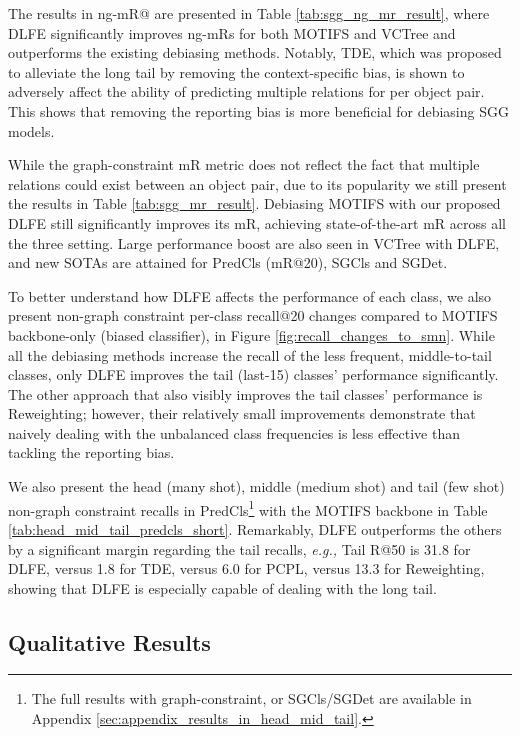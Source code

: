 \documentclass[sigconf]{acmart}
\begin{document}
The results in ng-mR@ are presented in Table \ref{tab:sgg_ng_mr_result}, where DLFE significantly improves ng-mRs for both MOTIFS and VCTree and outperforms the existing debiasing methods.
Notably, TDE, which was proposed to alleviate the long tail by removing the context-specific bias, is shown to adversely affect the ability of predicting multiple relations for per object pair.
This shows that removing the reporting bias is more beneficial for debiasing SGG models.


While the graph-constraint mR metric does not reflect the fact that multiple relations could exist between an object pair, due to its popularity we still present the results in Table \ref{tab:sgg_mr_result}.
Debiasing MOTIFS with our proposed DLFE still significantly improves its mR, achieving state-of-the-art mR across all the three setting.
Large performance boost are also seen in VCTree with DLFE, and new SOTAs are attained for PredCls (mR@20), SGCls and SGDet.



To better understand how DLFE affects the performance of each class, we also present non-graph constraint per-class recall@20 changes compared to MOTIFS backbone-only (biased classifier), in Figure \ref{fig:recall_changes_to_smn}.
While all the debiasing methods increase the recall of the less frequent, middle-to-tail classes, only DLFE improves the tail (last-15) classes' performance significantly.
The other approach that also visibly improves the tail classes' performance is Reweighting; however, their relatively small improvements demonstrate that naively dealing with the unbalanced class frequencies is less effective than tackling the reporting bias.



We also present the head (many shot), middle (medium shot) and tail (few shot) non-graph constraint recalls in PredCls\footnote{The full results with graph-constraint, or SGCls/SGDet are available in Appendix \ref{sec:appendix_results_in_head_mid_tail}.} with the MOTIFS backbone in Table \ref{tab:head_mid_tail_predcls_short}.
Remarkably, DLFE outperforms the others by a significant margin regarding the tail recalls, \emph{e.g.,} Tail R@50 is 31.8 for DLFE, versus 1.8 for TDE, versus 6.0 for PCPL, versus 13.3 for Reweighting, showing that DLFE is especially capable of dealing with the long tail.

\subsection{Qualitative Results}
\label{sec:qualitative_results}
\end{document}
